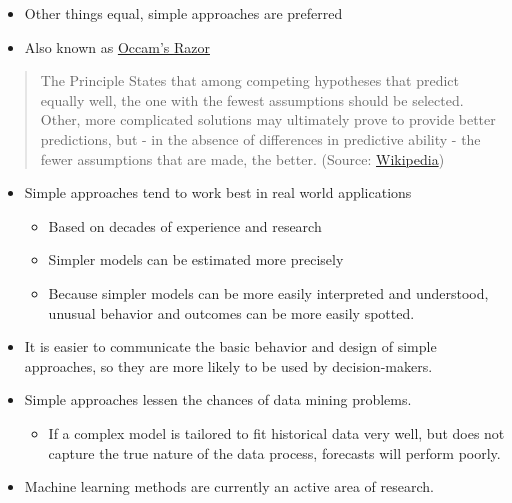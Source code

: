 \documentclass[
  letterpaper,
  DIV=11,
  numbers=noendperiod]{scrreprt}
\providecommand{\tightlist}{%
  \setlength{\itemsep}{0pt}\setlength{\parskip}{0pt}}\usepackage{longtable,booktabs,array}
\begin{document}
\begin{enumerate}
  \begin{itemize}
  \tightlist
  \item
    Other things equal, simple approaches are preferred
  \item
    Also known as
    \href{https://en.wikipedia.org/wiki/Occam\%27s_razor}{Occam's Razor}
  \end{itemize}

  \begin{quote}
  The Principle States that among competing hypotheses that predict
  equally well, the one with the fewest assumptions should be selected.
  Other, more complicated solutions may ultimately prove to provide
  better predictions, but - in the absence of differences in predictive
  ability - the fewer assumptions that are made, the better. (Source:
  \href{https://en.wikipedia.org/wiki/Occam\%27s_razor}{Wikipedia})
  \end{quote}

  \begin{itemize}
  \item
    Simple approaches tend to work best in real world applications

    \begin{itemize}
    \tightlist
    \item
      Based on decades of experience and research
    \item
      Simpler models can be estimated more precisely
    \item
      Because simpler models can be more easily interpreted and
      understood, unusual behavior and outcomes can be more easily
      spotted.
    \end{itemize}
  \item
    It is easier to communicate the basic behavior and design of simple
    approaches, so they are more likely to be used by decision-makers.
  \item
    Simple approaches lessen the chances of data mining problems.

    \begin{itemize}
    \tightlist
    \item
      If a complex model is tailored to fit historical data very well,
      but does not capture the true nature of the data process,
      forecasts will perform poorly.
    \end{itemize}
  \item
    Machine learning methods are currently an active area of research.
  \end{itemize}
\end{enumerate}
\end{document}
